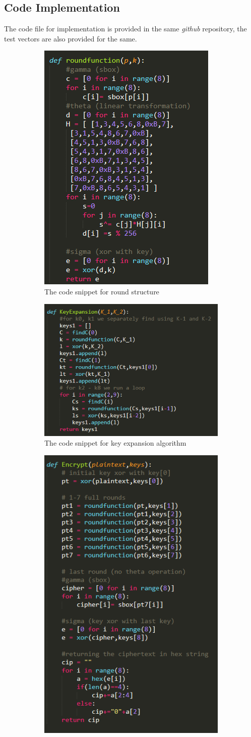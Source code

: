\documentclass[preprint]{transcrypto}
\begin{document}
\subsection{Code Implementation} 
The code file for implementation is provided in the same \textit{github} repository, the test vectors are also provided for the same.
\begin{figure}[H]
		\begin{subfigure}{.5\textwidth}
			\centering
			\includegraphics[width=.4\linewidth]{Screenshots/roundr.png}  
			\caption{The code snippet for round structure}
			\label{fig:sub-first}
		\end{subfigure}
		\begin{subfigure}{.5\textwidth}
			\centering
			\includegraphics[width=.4\linewidth]{Screenshots/keyex.png}  
			\caption{The code snippet for key expansion algorithm}
			\label{fig:sub-second}
		\end{subfigure}
		\begin{subfigure}{.5\textwidth}
			\centering
			\includegraphics[width=.4\linewidth]{Screenshots/encr.png}  

\end{subfigure}
\end{figure}
\end{document}
